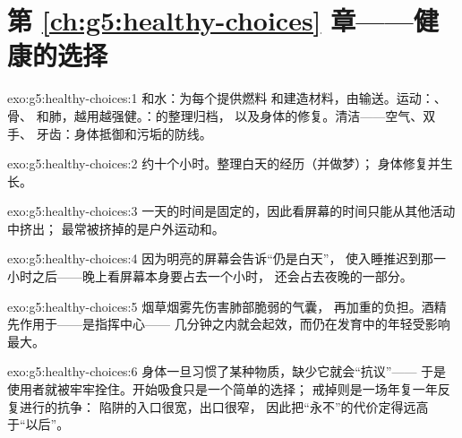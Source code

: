 \section*{第 \ref{ch:g5:healthy-choices} 章——健康的选择}

\begin{solution}{exo:g5:healthy-choices:1}
和水：为每个提供燃料
和建造材料，由输送。运动：、骨、
和肺，越用越强健。：的整理归档，
以及身体的修复。清洁——空气、双手、
牙齿：身体抵御和污垢的防线。
\end{solution}

\begin{solution}{exo:g5:healthy-choices:2}
约十个小时。整理白天的经历（并做梦）；
身体修复并生长。
\end{solution}

\begin{solution}{exo:g5:healthy-choices:3}
一天的时间是固定的，因此看屏幕的时间只能从其他活动中挤出；
最常被挤掉的是户外运动和。
\end{solution}

\begin{solution}{exo:g5:healthy-choices:4}
因为明亮的屏幕会告诉“仍是白天”，
使入睡推迟到那一小时之后——晚上看屏幕本身要占去一个小时，
还会占去夜晚的一部分。
\end{solution}

\begin{solution}{exo:g5:healthy-choices:5}
烟草烟雾先伤害肺部脆弱的气囊，
再加重的负担。酒精先作用于——是指挥中心——
几分钟之内就会起效，而仍在发育中的年轻受影响
最大。
\end{solution}

\begin{solution}{exo:g5:healthy-choices:6}
身体一旦习惯了某种物质，缺少它就会“抗议”——
于是使用者就被牢牢拴住。开始吸食只是一个简单的选择；
戒掉则是一场年复一年反复进行的抗争：
陷阱的入口很宽，出口很窄，
因此把“永不”的代价定得远高于“以后”。
\end{solution}


